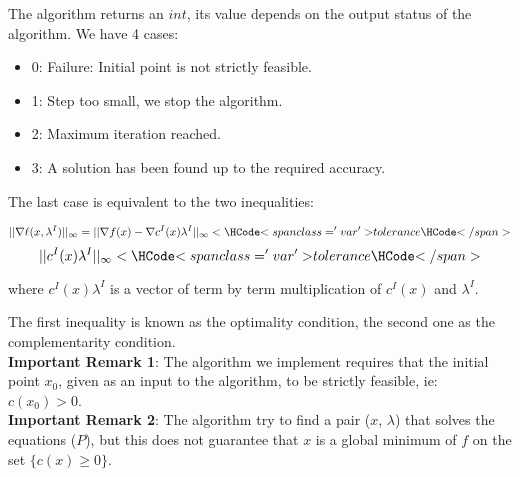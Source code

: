 \begin{itemize}
  The algorithm returns an $int$, its value depends on the output status of the algorithm. We have 4 cases:

  \begin{itemize}
  \item 0: Failure: Initial point is not strictly feasible.
  \item 1: Step too small, we stop the algorithm.
  \item 2: Maximum iteration reached.
  \item 3: A solution has been found up to the required accuracy.
  \end{itemize}

  The last case is equivalent to the two inequalities:

  $$ || \nabla \ell(x,\lambda^I)||_{\infty} = ||\nabla f(x) - \nabla c^I(x) \lambda^I ||_{\infty} < \var{tolerance} $$
  $$ || c^I(x) \lambda^I ||_{\infty} < \var{tolerance} $$

  where $c^I(x) \lambda^I$ is a vector of term by term multiplication of $c^I(x)$ and $\lambda^I$.

  The first inequality is known as the optimality condition, the second one as the complementarity condition.\\

  \textbf{Important Remark 1}: The algorithm we implement requires that the initial point $x_0$, given as an input to the algorithm, to be strictly feasible, ie: $c(x_0)>0$.\\
  \textbf{Important Remark 2}: The algorithm try to find a pair ($x$, $\lambda$) that solves the equations ($P$), but this does not guarantee that $x$ is a global minimum of $f$ on the set $\{c(x)\geq0\}$.

\end{itemize}


